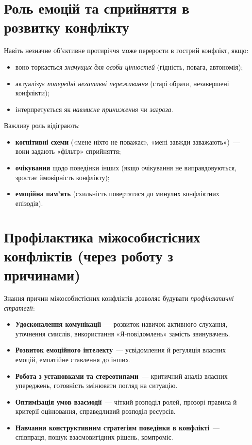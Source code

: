 \documentclass[12pt,a4paper]{article}
\begin{document}
    \section*{Роль емоцій та сприйняття в розвитку конфлікту}
    Навіть незначне об’єктивне протиріччя може перерости в гострий конфлікт, якщо:
    \begin{itemize}
        \item воно торкається \textit{значущих для особи цінностей} (гідність, повага, автономія);
        \item актуалізує \textit{попередні негативні переживання} (старі образи, незавершені конфлікти);
        \item інтерпретується як \textit{навмисне приниження} чи \textit{загроза}.
    \end{itemize}

    Важливу роль відіграють:
    \begin{itemize}
        \item \textbf{когнітивні схеми} («мене ніхто не поважає», «мені завжди заважають»)~--- вони задають «фільтр» сприйняття;
        \item \textbf{очікування} щодо поведінки інших (якщо очікування не виправдовуються, зростає ймовірність конфлікту);
        \item \textbf{емоційна пам’ять} (схильність повертатися до минулих конфліктних епізодів).
    \end{itemize}

    \section*{Профілактика міжособистісних конфліктів (через роботу з причинами)}
    Знання причин міжособистісних конфліктів дозволяє будувати \textit{профілактичні стратегії}:
    \begin{itemize}
        \item \textbf{Удосконалення комунікації}~--- розвиток навичок активного слухання, уточнення смислів, використання «Я-повідомлень» замість звинувачень.
        \item \textbf{Розвиток емоційного інтелекту}~--- усвідомлення й регуляція власних емоцій, емпатійне ставлення до інших.
        \item \textbf{Робота з установками та стереотипами}~--- критичний аналіз власних упереджень, готовність змінювати погляд на ситуацію.
        \item \textbf{Оптимізація умов взаємодії}~--- чіткий розподіл ролей, прозорі правила й критерії оцінювання, справедливий розподіл ресурсів.
        \item \textbf{Навчання конструктивним стратегіям поведінки в конфлікті}~--- співпраця, пошук взаємовигідних рішень, компроміс.
    \end{itemize}
\end{document}
